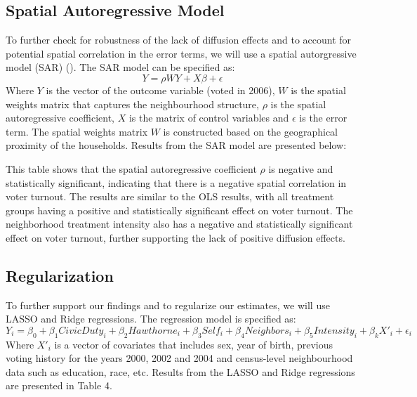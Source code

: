 \documentclass[11pt]{article}
\begin{document}
\subsection{Spatial Autoregressive Model}
To further check for robustness of the lack of diffusion effects and to account for potential spatial correlation in the error terms, we will use a spatial autorgressive model (SAR) (\cite{lord_chapter_2021}). The SAR model can be specified as:
\begin{equation}
    Y = \rho W Y + X\beta + \epsilon
\end{equation}
Where $Y$ is the vector of the outcome variable (voted in 2006), $W$ is the spatial weights matrix that captures the neighbourhood structure, $\rho$ is the spatial autoregressive coefficient, $X$ is the matrix of control variables and $\epsilon$ is the error term. The spatial weights matrix $W$ is constructed based on the geographical proximity of the households. Results from the SAR model are presented below:
\begin{table}[H]
    \begin{centering}
        
    \end{centering}
\end{table}

This table shows that the spatial autoregressive coefficient $\rho$ is negative and statistically significant, indicating that there is a negative spatial correlation in voter turnout. The results are similar to the OLS results, with all treatment groups having a positive and statistically significant effect on voter turnout. The neighborhood treatment intensity also has a negative and statistically significant effect on voter turnout, further supporting the lack of positive diffusion effects.

\subsection{Regularization}
To further support our findings and to regularize our estimates, we will use LASSO and Ridge regressions. The regression model is specified as:
\begin{equation}
    Y_i = \beta_0 + \beta_1 CivicDuty_i + \beta_2 Hawthorne_i + \beta_3 Self_i + \beta_4 Neighbors_i + \beta_5 Intensity_i + \beta_k X'_i + \epsilon_i
\end{equation}
Where $X'_i$ is a vector of covariates that includes sex, year of birth, previous voting history for the years 2000, 2002 and 2004 and census-level neighbourhood data such as education, race, etc. Results from the LASSO and Ridge regressions are presented in Table 4.
\end{document}
